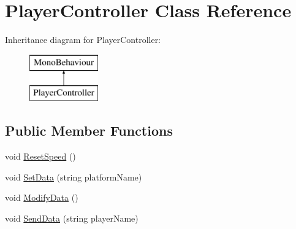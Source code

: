 \hypertarget{class_player_controller}{}\section{Player\+Controller Class Reference}
\label{class_player_controller}
Inheritance diagram for Player\+Controller\+:\begin{figure}[H]
\begin{center}
\leavevmode
\includegraphics[height=2.000000cm]{class_player_controller}
\end{center}
\end{figure}
\subsection*{Public Member Functions}
\begin{DoxyCompactItemize}
\item 
void \mbox{\hyperlink{class_player_controller_a2037a2ff31a22db7022be1ad13c61a9d}{Reset\+Speed}} ()
\item 
void \mbox{\hyperlink{class_player_controller_ab1e5300124eb1aa3216cefa0e0ed4460}{Set\+Data}} (string platform\+Name)
\item 
void \mbox{\hyperlink{class_player_controller_a60e37777514faf874beb60a082340cde}{Modify\+Data}} ()
\item 
void \mbox{\hyperlink{class_player_controller_a4d4f54d88d40a29e71dd15a7f71d7348}{Send\+Data}} (string player\+Name)
\end{DoxyCompactItemize}
